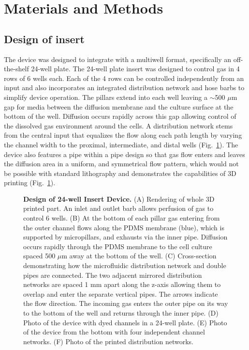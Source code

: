 \documentclass[10pt,letterpaper]{article}
\begin{document}
\section*{Materials and Methods}
\subsection*{Design of insert}

The device was designed to integrate with a multiwell format, specifically an off-the-shelf 24-well plate. 
The 24-well plate insert was designed to control gas in 4 rows of 6 wells each. 
Each of the 4 rows can be controlled independently from an input and also incorporates an integrated distribution network and hose barbs to simplify device operation.
The pillars extend into each well leaving a $\sim$500 $\mu$m gap for media between the diffusion membrane and the culture surface at the bottom of the well.
Diffusion occurs rapidly across this gap allowing control of the dissolved gas environment around the cells. 
A distribution network stems from the central input that equalizes the flow along each path length by varying the channel width to the proximal, intermediate, and distal wells (Fig.~\ref{fig1}).
The device also features a pipe within a pipe design so that gas flow enters and leaves the diffusion area in a uniform, and symmetrical flow pattern, which would not be possible with standard lithography and demonstrates the capabilities of 3D printing (Fig.~\ref{fig1}).


\begin{figure}[h]
\caption{
{\bf Design of 24-well Insert Device.}
(A) Rendering of whole 3D printed part.
An inlet and outlet barb allows perfusion of gas to control 6 wells.
(B) At the bottom of each pillar gas entering from the outer channel flows along the PDMS membrane (blue), which is supported by micropillars, and exhausts via the inner pipe.
Diffusion occurs rapidly through the PDMS membrane to the cell culture spaced 500 $\mu$m away at the bottom of the well.
(C) Cross-section demonstrating how the microfluidic distribution network and double pipes are connected. 
The two adjacent mirrored distribution networks are spaced 1 mm apart along the z-axis allowing them to overlap and enter the separate vertical pipes.
The arrows indicate the flow direction.
The incoming gas enters the outer pipe on its way to the bottom of the well and returns through the inner pipe.
(D) Photo of the device with dyed channels in a 24-well plate.
(E) Photo of the device from the bottom with four independent channel networks.
(F) Photo of the printed distribution networks.
}
\label{fig1}
\end{figure}
\end{document}
